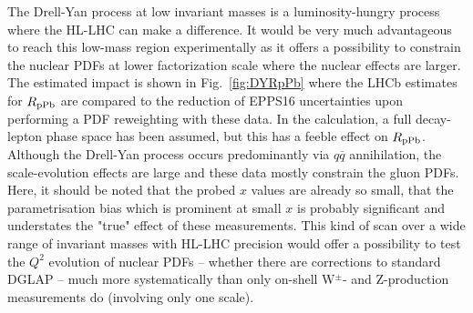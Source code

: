 \documentclass[../report.tex]{subfiles}
\begin{document}
%
The Drell-Yan process at low invariant masses is a luminosity-hungry process where the HL-LHC can make a difference. It would be very much advantageous to reach this low-mass region experimentally as it offers a possibility to constrain the nuclear PDFs at lower factorization scale where the nuclear effects are larger. The estimated impact is shown in Fig.~\ref{fig:DYRpPb} where the LHCb estimates for $R_{\rm pPb}$ are compared to the reduction of EPPS16 uncertainties upon performing a PDF reweighting \cite{Paukkunen:2014zia} with these data. In the calculation, a full decay-lepton phase space has been assumed, but this has a feeble effect on $R_{\rm pPb}$. Although the Drell-Yan process occurs predominantly via $q\overline{q}$ annihilation, the scale-evolution effects are large and these data mostly constrain the gluon PDFs. Here, it should be noted that the probed $x$ values are already so small, that the parametrisation bias which is prominent at small $x$ \cite{Aschenauer:2017oxs, Paukkunen:2017phq} is probably significant and understates the "true" effect of these measurements. This kind of scan over a wide range of invariant masses with HL-LHC precision would offer a possibility to test the $Q^2$ evolution of nuclear PDFs -- whether there are corrections to standard DGLAP -- much more systematically than only on-shell W$^\pm$- and Z-production measurements do (involving only one scale).




%

\end{document}
